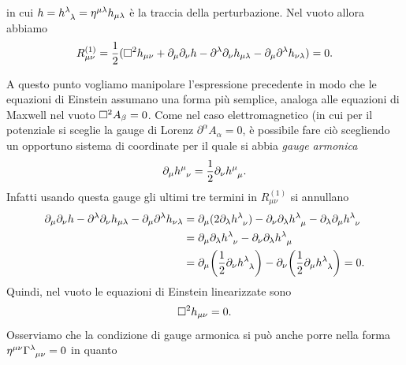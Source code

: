 in cui $h = \tensor{h}{^{\lambda}_{\lambda}} = \eta^{\mu\lambda} h_{\mu\lambda}$
è la traccia della perturbazione.  Nel vuoto allora abbiamo
\begin{equation}
  R_{\mu\nu}^{(1)} = \frac{1}{2} (\Box^{2} h_{\mu\nu}
  + \partial_{\mu}\partial_{\nu} h - \partial^{\lambda}\partial_{\nu}
  h_{\mu\lambda} - \partial_{\mu}\partial^{\lambda} h_{\nu\lambda}) = 0.
\end{equation}

A questo punto vogliamo manipolare l'espressione precedente in modo che le
equazioni di Einstein assumano una forma più semplice, analoga alle equazioni di
Maxwell nel vuoto $\Box^{2} A_{\beta} = 0$.  Come nel caso elettromagnetico (in
cui per il potenziale si sceglie la gauge di Lorenz $\partial^{\alpha}
A_{\alpha}=0$, è possibile fare ciò scegliendo un opportuno sistema di
coordinate per il quale si abbia \emph{gauge armonica}
\begin{equation}
  \label{eq:gauge-armonica}
  \partial_{\mu} \tensor{h}{^{\mu}_{\nu}} =
  \frac{1}{2}\partial_{\nu}\tensor{h}{^{\mu}_{\mu}}.
\end{equation}
Infatti usando questa gauge gli ultimi tre termini in $R_{\mu \nu}^{(1)}$
si annullano
\begin{equation}
  \begin{split}
    \partial_{\mu}\partial_{\nu} h - \partial^{\lambda}\partial_{\nu}
    h_{\mu\lambda} - \partial_{\mu}\partial^{\lambda} h_{\nu\lambda}
    &= \partial_{\mu}(2 \partial_{\lambda}\tensor{h}{^{\lambda}_{\nu}})
    - \partial_{\nu}\partial_{\lambda}\tensor{h}{^{\lambda}_{\mu}}
    - \partial_{\lambda}\partial_{\mu} \tensor{h}{^{\lambda}_{\nu}} \\
    &= \partial_{\mu}\partial_{\lambda} \tensor{h}{^{\lambda}_{\nu}}
    - \partial_{\nu}\partial_{\lambda} \tensor{h}{^{\lambda}_{\mu}} \\
    &= \partial_{\mu}\bigg(\frac{1}{2}\partial_{\nu}
    \tensor{h}{^{\lambda}_{\lambda}}\bigg)
    - \partial_{\nu}\bigg(\frac{1}{2}\partial_{\mu}
    \tensor{h}{^{\lambda}_{\lambda}}\bigg) = 0.
  \end{split}
\end{equation}
Quindi, nel vuoto  le equazioni di Einstein linearizzate sono
\begin{equation}
  \label{eq:einstein-lineare}
  \Box^{2} h_{\mu\nu} = 0.
\end{equation}
Osserviamo che la condizione di gauge armonica si può anche porre nella forma
$\eta^{\mu\nu}\tensor{\Gamma}{^{\lambda}_{\mu\nu}} = 0$ in quanto
